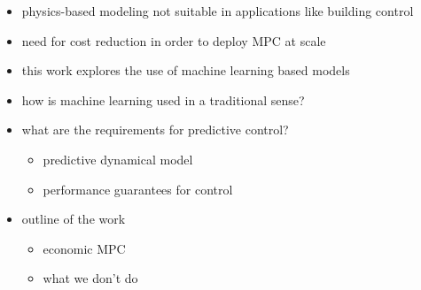 \begin{itemize}
	\item physics-based modeling not suitable in applications like building control  
	\item need for cost reduction in order to deploy MPC at scale  
	\item this work explores the use of machine learning based models  
	\item how is machine learning used in a traditional sense?  
	\item what are the requirements for predictive control?
	\begin{itemize}
		\item predictive dynamical model
		\item performance guarantees for control
	\end{itemize}
	\item outline of the work
	\begin{itemize}
		\item economic MPC
		\item what we don't do
	\end{itemize}
\end{itemize}